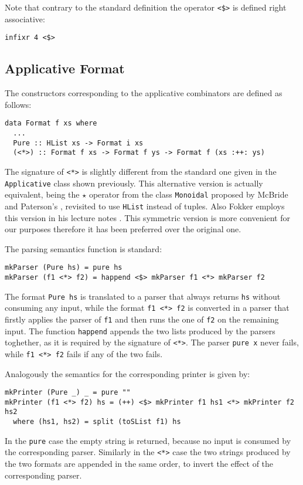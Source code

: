 \documentclass[../Thesis.tex]{subfiles}
\begin{document}
Note that contrary to the standard definition the operator \texttt{<\$>} is defined right associative:

\begin{verbatim}
infixr 4 <$>
\end{verbatim}

\subsection{Applicative Format}
\label{subsec:ApplicativeFormat}
The constructors corresponding to the applicative combinators are defined as follows:

\begin{verbatim}
data Format f xs where
  ...
  Pure :: HList xs -> Format i xs
  (<*>) :: Format f xs -> Format f ys -> Format f (xs :++: ys)
\end{verbatim}

The signature of \texttt{<*>} is slightly different from the standard 
one given in the \texttt{Applicative} class shown previously.
This alternative version is actually equivalent, being the  \texttt{$\star$} 
operator from the class \texttt{Monoidal} proposed by McBride and Paterson’s 
\cite{Mcbride08Ape}, revisited to use \texttt{HList} instead of tuples.
Also Fokker employs this version in his lecture notes 
\cite{Fokker}.
This symmetric version is more convenient for our purposes therefore it has been preferred over the original one.

The parsing semantics function is standard:
\begin{verbatim}
mkParser (Pure hs) = pure hs
mkParser (f1 <*> f2) = happend <$> mkParser f1 <*> mkParser f2
\end{verbatim} 
The format \texttt{Pure hs} is translated to a parser that always returns \texttt{hs} without consuming any input, while the format
\texttt{f1 <*> f2} is converted in a parser that firstly applies the parser of \texttt{f1} and then runs the one of \texttt{f2} on the remaining input. The function \texttt{happend} appends the two lists produced by the parsers toghether, as it is required by the signature of \texttt{<*>}.
The parser \texttt{pure x} never fails, while \texttt{f1 <*> f2}
fails if any of the two fails.

Analogously the semantics for the corresponding printer is given by:
\begin{verbatim}
mkPrinter (Pure _) _ = pure ""
mkPrinter (f1 <*> f2) hs = (++) <$> mkPrinter f1 hs1 <*> mkPrinter f2 hs2
  where (hs1, hs2) = split (toSList f1) hs
\end{verbatim} 
In the \texttt{pure} case the empty string is returned, because no input is consumed by the corresponding parser.
Similarly in the \texttt{<*>} case the two strings produced by the two formats are appended in the same order, to invert the effect of the corresponding parser.
\end{document}
